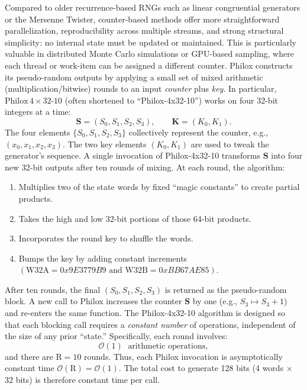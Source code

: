 Compared to older recurrence-based RNGs such as linear congruential generators or the Mersenne Twister, counter-based methods offer more straightforward parallelization, reproducibility across multiple streams, and strong structural simplicity: no internal state must be updated or maintained. This is particularly valuable in distributed Monte Carlo simulations or GPU-based sampling, where each thread or work-item can be assigned a different counter. Philox constructs its pseudo-random outputs by applying a small set of mixed arithmetic (multiplication/bitwise) rounds to an input \emph{counter} plus \emph{key}. In particular, \(\mathrm{Philox}\,4\times32\text{-10}\) (often shortened to “Philox-4x32-10”) works on four 32-bit integers at a time:
\[
  \mathbf{S} = (S_0, S_1, S_2, S_3),
  \qquad
  \mathbf{K} = (K_0, K_1).
\]
The four elements \(\{S_0, S_1, S_2, S_3\}\) collectively represent the counter, e.g., \((x_0, x_1, x_2, x_3)\). The two key elements \((K_0, K_1)\) are used to tweak the generator’s sequence. A single invocation of Philox-4x32-10 transforms \(\mathbf{S}\) into four new 32-bit outputs after ten rounds of mixing. At each round, the algorithm:
\begin{enumerate}
    \item Multiplies two of the state words by fixed “magic constants” to create partial products.
    \item Takes the high and low 32-bit portions of those 64-bit products.
    \item Incorporates the round key to shuffle the words.
    \item Bumps the key by adding constant increments \((\mathrm{W32A} = 0x9E3779B9 \text{ and } \mathrm{W32B} = 0xBB67AE85)\).
\end{enumerate}
After ten rounds, the final \((S_0, S_1, S_2, S_3)\) is returned as the pseudo-random block. A new call to Philox increases the counter \(\mathbf{S}\) by one (e.g., \(S_3 \mapsto S_3 + 1\)) and re-enters the same function. The Philox-4x32-10 algorithm is designed so that each blocking call requires a \emph{constant number} of operations, independent of the size of any prior “state.” Specifically, each round involves:
\[
  \mathcal{O}(1)\;\text{ arithmetic operations},
\]
and there are \(\mathrm{R} = 10\) rounds. Thus, each Philox invocation is asymptotically constant time \(\mathcal{O}(\mathrm{R}) = \mathcal{O}(1)\). The total cost to generate 128 bits (4 words \(\times\) 32 bits) is therefore constant time per call.

